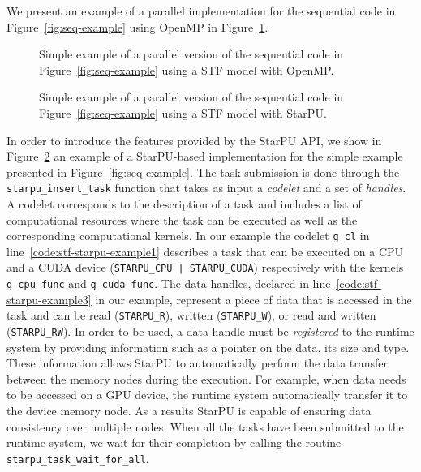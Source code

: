 \documentclass{article}
\newcommand{\starpu}{{StarPU}\xspace}
\newcommand{\openmp}{OpenMP\xspace}
\begin{document}
We present an example of a parallel implementation for the sequential
code in Figure~\ref{fig:seq-example} using OpenMP in
Figure~\ref{fig:stf-openmp-example}.

\begin{figure}[!h]
  \centering 
  \caption{\label{fig:stf-openmp-example}Simple example of a parallel version
    of the sequential code in Figure~\ref{fig:seq-example} using a STF
    model with \openmp.}
\end{figure}

\begin{figure}[!h]
  \centering 
  \caption{\label{fig:stf-starpu-example}Simple example of a parallel version
    of the sequential code in Figure~\ref{fig:seq-example} using a STF
    model with \starpu.}
\end{figure}

In order to introduce the features provided by the StarPU API, we show
in Figure~\ref{fig:stf-starpu-example} an example of a StarPU-based
implementation for the simple example presented in
Figure~\ref{fig:seq-example}. The task submission is done through the
\texttt{starpu\_insert\_task} function that takes as input a
\textit{codelet} and a set of \textit{handles}. A codelet corresponds
to the description of a task and includes a list of computational
resources where the task can be executed as well as the corresponding
computational kernels. In our example the codelet \texttt{g\_cl} in
line~\ref{code:stf-starpu-example1} describes a task that can be
executed on a CPU and a CUDA device (\texttt{STARPU\_CPU |
  STARPU\_CUDA}) respectively with the kernels \texttt{g\_cpu\_func}
and \texttt{g\_cuda\_func}. The data handles, declared in
line~\ref{code:stf-starpu-example3} in our example, represent a piece
of data that is accessed in the task and can be read
(\texttt{STARPU\_R}), written (\texttt{STARPU\_W}), or read and
written (\texttt{STARPU\_RW}). In order to be used, a data handle must
be \textit{registered} to the runtime system by providing information
such as a pointer on the data, its size and type. These information
allows StarPU to automatically perform the data transfer between the
memory nodes during the execution. For example, when data needs to be
accessed on a GPU device, the runtime system automatically transfer it
to the device memory node. As a results StarPU is capable of ensuring
data consistency over multiple nodes. When all the tasks have been
submitted to the runtime system, we wait for their completion by
calling the routine \texttt{starpu\_task\_wait\_for\_all}.
\end{document}
